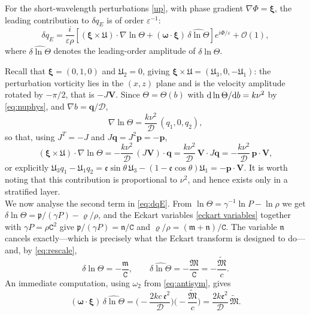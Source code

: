 \documentclass[reqno]{amsart}
\newcommand{\m}{\mathfrak{m}}
\newcommand{\nn}{\mathfrak{n}}
\newcommand{\cs}{\texttt{C}}
\newcommand{\A}{\boldsymbol{\mathfrak{U}}}              %
\newcommand{\B}{{\mathfrak{M}}}
\newcommand{\D}{\mathcal{D}}
\newcommand{\ee}{\mathfrak{e}}
\newcommand{\e}{{\varepsilon}}
\newcommand{\fp}{\mathfrak{p}}          %
\begin{document}
For the short-wavelength perturbations \eqref{up}, with phase gradient $\nabla\Phi=\boldsymbol\xi$, the leading contribution to $\delta q_E$ is of order $\e^{-1}$:
\begin{equation}\label{eq:dqE}
\delta q_E
=
\frac{i}{\e\rho}
\left[
(\boldsymbol\xi\times\A)\cdot\nabla\ln\Theta
+
(\boldsymbol\omega\cdot\boldsymbol\xi)\,
\widehat{\delta\ln\Theta}
\right]e^{i\Phi/\e}
+\mathcal{O}(1),
\end{equation}
where $\widehat{\delta\ln\Theta}$ denotes the leading-order amplitude of $\delta\ln\Theta$.

Recall that $\boldsymbol\xi=(0,1,0)$ and $\mathfrak{U}_2=0$, giving $\boldsymbol\xi\times\A=(\mathfrak{U}_3,0,-\mathfrak{U}_1)$: the perturbation vorticity lies in the $(x,z)$ plane and is the velocity amplitude rotated by $-\pi/2$, that is $-J\mathbf V$. Since $\Theta=\Theta(b)$ with ${\rm d}\ln\Theta/{\rm d}b=k\nu^{2}$ by \eqref{eq:nuphys}, and $\nabla b=\mathbf q/\D$,
\begin{equation}
\nabla\ln\Theta=\frac{k\nu^{2}}{\D}\,(q_1,0,q_2),
\end{equation}
so that, using $J^{T}=-J$ and $J\mathbf q=J^{2}\mathbf p=-\mathbf p$,
\begin{equation}\label{eq:term1}
(\boldsymbol\xi\times\A)\cdot\nabla\ln\Theta
=-\frac{k\nu^{2}}{\D}\,(J\mathbf V)\cdot\mathbf q
=\frac{k\nu^{2}}{\D}\,\mathbf V\cdot J\mathbf q
=-\frac{k\nu^{2}}{\D}\,\mathbf p\cdot\mathbf V ,
\end{equation}
or explicitly $\mathfrak{U}_3q_1-\mathfrak{U}_1q_2=\ee\sin\theta\,\mathfrak{U}_3-(1-\ee\cos\theta)\mathfrak{U}_1=-\mathbf p\cdot\mathbf V$. It is worth noting that this contribution is proportional to $\nu^{2}$, and hence exists only in a stratified layer.\\
\noindent
We now analyse the second term in \eqref{eq:dqE}. From $\ln\Theta=\gamma^{-1}\ln P-\ln\rho$ we get $\delta\ln\Theta=\fp/(\gamma P)-\varrho/\rho$, and the Eckart variables \eqref{eckart variables} together with $\gamma P=\rho\cs^{2}$ give $\fp/(\gamma P)=\nn/\cs$ and $\varrho/\rho=(\m+\nn)/\cs$. The variable $\nn$ cancels exactly---which is precisely what the Eckart transform is designed to do---and, by \eqref{eq:rescale},
\begin{equation}
\delta\ln\Theta=-\frac{\m}{\cs},\qquad
\widehat{\delta\ln\Theta}=-\frac{\B}{\cs}=-\frac{\widetilde{\B}}{c}.
\end{equation}
An immediate computation, using $\omega_2$ from \eqref{eq:antisym}, gives
\begin{equation}\label{eq:term2}
(\boldsymbol\omega\cdot\boldsymbol\xi)\,\widehat{\delta\ln\Theta}
=\Big(-\frac{2kc\,\ee^{2}}{\D}\Big)\Big(-\frac{\widetilde{\B}}{c}\Big)
=\frac{2k\ee^{2}}{\D}\,\widetilde{\B}.
\end{equation}
\end{document}
